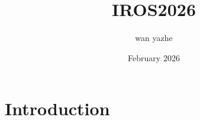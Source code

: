 \documentclass[letterpaper, 10 pt, conference]{ieeeconf}
\title{IROS2026}
\author{wan yazhe}
\date{February 2026}
\begin{document}
\maketitle






\section{Introduction}
\end{document}
